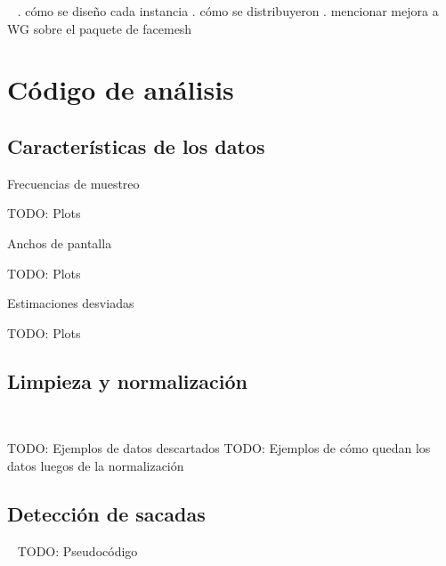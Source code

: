 \documentclass[aspectratio=169]{beamer}
\begin{document}
\begin{frame}{~}
. cómo se diseño cada instancia
. cómo se distribuyeron
. mencionar mejora a WG sobre el paquete de facemesh
\end{frame}

\section{Código de análisis}

\subsection{Características de los datos}

\begin{frame}{Frecuencias de muestreo}

TODO: Plots

\end{frame}

\begin{frame}{Anchos de pantalla}

TODO: Plots

\end{frame}

\begin{frame}{Estimaciones desviadas}

TODO: Plots

\end{frame}

\subsection{Limpieza y normalización}

\begin{frame}{~}

TODO: Ejemplos de datos descartados
TODO: Ejemplos de cómo quedan los datos luegos de la normalización

\end{frame}

\subsection{Detección de sacadas}

\begin{frame}{~}
TODO: Pseudocódigo
\end{frame}
\end{document}
